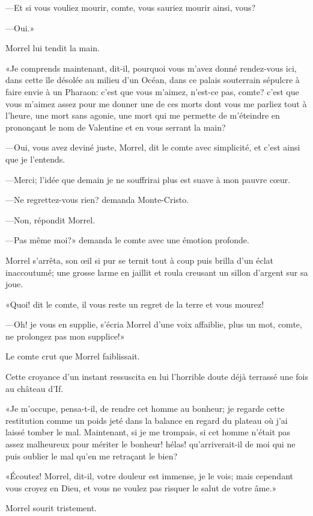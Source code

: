 —Et si vous vouliez mourir, comte, vous sauriez mourir ainsi, vous? 

—Oui.» 

Morrel lui tendit la main. 

«Je comprends maintenant, dit-il, pourquoi vous m'avez donné rendez-vous ici, dans cette île désolée au milieu d'un Océan, dans ce palais souterrain sépulcre à faire envie à un Pharaon: c'est que vous m'aimez, n'est-ce pas, comte? c'est que vous m'aimez assez pour me donner une de ces morts dont vous me parliez tout à l'heure, une mort sans agonie, une mort qui me permette de m'éteindre en prononçant le nom de Valentine et en vous serrant la main? 

—Oui, vous avez deviné juste, Morrel, dit le comte avec simplicité, et c'est ainsi que je l'entends. 

—Merci; l'idée que demain je ne souffrirai plus est suave à mon pauvre cœur. 

—Ne regrettez-vous rien? demanda Monte-Cristo. 

—Non, répondit Morrel. 

—Pas même moi?» demanda le comte avec une émotion profonde. 

Morrel s'arrêta, son œil si pur se ternit tout à coup puis brilla d'un éclat inaccoutumé; une grosse larme en jaillit et roula creusant un sillon d'argent sur sa joue. 

«Quoi! dit le comte, il vous reste un regret de la terre et vous mourez! 

—Oh! je vous en supplie, s'écria Morrel d'une voix affaiblie, plus un mot, comte, ne prolongez pas mon supplice!» 

Le comte crut que Morrel faiblissait. 

Cette croyance d'un instant ressuscita en lui l'horrible doute déjà terrassé une fois au château d'If. 

«Je m'occupe, pensa-t-il, de rendre cet homme au bonheur; je regarde cette restitution comme un poids jeté dans la balance en regard du plateau où j'ai laissé tomber le mal. Maintenant, si je me trompais, si cet homme n'était pas assez malheureux pour mériter le bonheur! hélas! qu'arriverait-il de moi qui ne puis oublier le mal qu'en me retraçant le bien? 

«Écoutez! Morrel, dit-il, votre douleur est immense, je le vois; mais cependant vous croyez en Dieu, et vous ne voulez pas risquer le salut de votre âme.» 

Morrel sourit tristement. 

